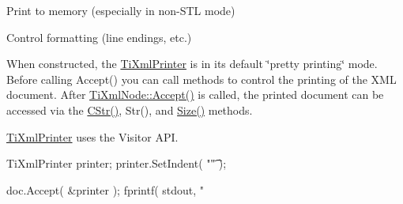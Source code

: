 \begin{DoxyEnumerate}
\item \-Print to memory (especially in non-\/\-S\-T\-L mode)
\item \-Control formatting (line endings, etc.)
\end{DoxyEnumerate}

\-When constructed, the \hyperlink{class_ti_xml_printer}{\-Ti\-Xml\-Printer} is in its default \char`\"{}pretty printing\char`\"{} mode. \-Before calling \-Accept() you can call methods to control the printing of the \-X\-M\-L document. \-After \hyperlink{class_ti_xml_node_acc0f88b7462c6cb73809d410a4f5bb86}{\-Ti\-Xml\-Node\-::\-Accept()} is called, the printed document can be accessed via the \hyperlink{class_ti_xml_printer_a859eede9597d3e0355b77757be48735e}{\-C\-Str()}, \-Str(), and \hyperlink{class_ti_xml_printer_ad01375ae9199bd2f48252eaddce3039d}{\-Size()} methods.

\hyperlink{class_ti_xml_printer}{\-Ti\-Xml\-Printer} uses the \-Visitor \-A\-P\-I. \begin{DoxyVerb}
	TiXmlPrinter printer;
	printer.SetIndent( "\t" );

	doc.Accept( &printer );
	fprintf( stdout, "%
	\end{DoxyVerb}
 


